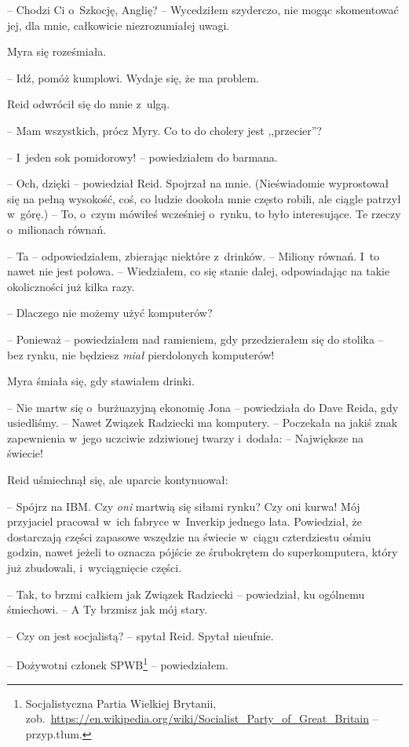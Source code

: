 \documentclass[oneside,polish,11pt,sfheadings]{mwbk}
\begin{document}
-- Chodzi Ci o~Szkocję, Anglię? -- Wycedziłem szyderczo, nie mogąc
skomentować jej, dla mnie, całkowicie niezrozumiałej uwagi.

Myra się roześmiała. 

-- Idź, pomóż kumplowi. Wydaje się, że ma problem.

Reid odwrócił się do mnie z~ulgą. 

-- Mam wszystkich, prócz Myry. Co to do
cholery jest ,,przecier''?

-- I~jeden sok pomidorowy! -- powiedziałem do barmana.

-- Och, dzięki -- powiedział Reid. Spojrzał na mnie. (Nieświadomie
wyprostował się na pełną wysokość, coś, co ludzie dookoła mnie często
robili, ale ciągle patrzył w~górę.) -- To, o~czym mówiłeś wcześniej o~rynku, to było interesujące. Te rzeczy o~milionach równań.

-- Ta -- odpowiedziałem, zbierając niektóre z~drinków. -- Miliony równań. I~to nawet nie jest połowa. -- Wiedziałem, co się stanie dalej,
odpowiadając na takie okoliczności już kilka razy.

-- Dlaczego nie możemy użyć komputerów?

-- Ponieważ -- powiedziałem nad ramieniem, gdy przedzierałem się do
stolika -- bez rynku, nie będziesz \emph{miał} pierdolonych komputerów!

Myra śmiała się, gdy stawiałem drinki. 

-- Nie martw się o~burżuazyjną
ekonomię Jona -- powiedziała do Dave Reida, gdy usiedliśmy. -- Nawet
Związek Radziecki ma komputery. -- Poczekała na jakiś znak zapewnienia w~jego uczciwie zdziwionej twarzy i~dodała: -- Największe na świecie!

Reid uśmiechnął się, ale uparcie kontynuował: 

-- Spójrz na IBM. Czy
\emph{oni} martwią się siłami rynku? Czy oni kurwa! Mój przyjaciel
pracował w~ich fabryce w~Inverkip jednego lata. Powiedział, że
dostarczają części zapasowe wszędzie na świecie w~ciągu czterdziestu
ośmiu godzin, nawet jeżeli to oznacza pójście ze śrubokrętem do
superkomputera, który już zbudowali, i~wyciągnięcie części.

-- Tak, to brzmi całkiem jak Związek Radziecki -- powiedział, ku ogólnemu
śmiechowi. -- A Ty brzmisz jak mój stary.

-- Czy on jest socjalistą? -- spytał Reid. Spytał nieufnie.

-- Dożywotni członek SPWB\footnote{ Socjalistyczna Partia Wielkiej Brytanii,
zob.~\url{https://en.wikipedia.org/wiki/Socialist_Party_of_Great_Britain} -- przyp.tłum.} -- powiedziałem.
\end{document}
